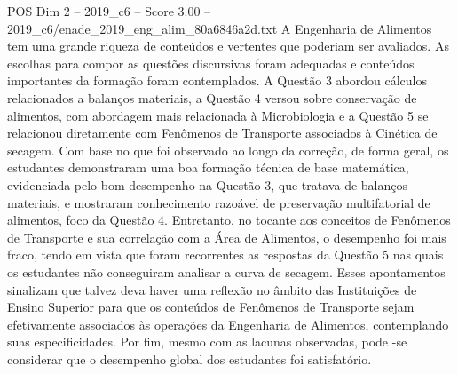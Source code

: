 \begin{textsample}{POS Dim 2 – 2019\_c6 – Score 3.00 – 2019\_c6/enade\_2019\_eng\_alim\_80a6846a2d.txt}
A Engenharia de Alimentos tem uma grande riqueza de conteúdos e vertentes que poderiam ser avaliados.
As escolhas para compor as questões discursivas foram adequadas e conteúdos importantes da formação foram contemplados.
A Questão 3 abordou cálculos relacionados a balanços materiais, a Questão 4 versou sobre conservação de alimentos, com abordagem mais relacionada à Microbiologia e a Questão 5 se relacionou diretamente com Fenômenos de Transporte associados à Cinética de secagem.
Com base no que foi observado ao longo da correção, de forma geral, os estudantes demonstraram uma boa formação técnica de base matemática, evidenciada pelo bom desempenho na Questão 3, que tratava de balanços materiais, e mostraram conhecimento razoável de preservação multifatorial de alimentos, foco da Questão 4.
Entretanto, no tocante aos conceitos de Fenômenos de Transporte e sua correlação com a Área de Alimentos, o desempenho foi mais fraco, tendo em vista que foram recorrentes as respostas da Questão 5 nas quais os estudantes não conseguiram analisar a curva de secagem.
Esses apontamentos sinalizam que talvez deva haver uma reflexão no âmbito das Instituições de Ensino Superior para que os conteúdos de Fenômenos de Transporte sejam efetivamente associados às operações da Engenharia de Alimentos, contemplando suas especificidades.
Por fim, mesmo com as lacunas observadas, pode -se considerar que o desempenho global dos estudantes foi satisfatório.

\end{textsample}
